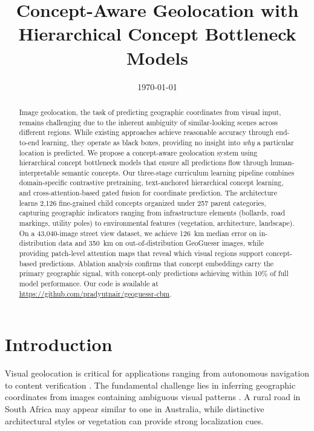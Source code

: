 \documentclass{uva-inf-article}
\title{Concept-Aware Geolocation with Hierarchical Concept Bottleneck Models}
\date{\today}
\begin{document}
\maketitle

\begingroup
\setlength{\parskip}{0pt}
\setlength{\baselineskip}{0.9\baselineskip}
\tableofcontents
\endgroup
\pagebreak

\begin{abstract}
Image geolocation, the task of predicting geographic coordinates from visual input, remains challenging due to the inherent ambiguity of similar-looking scenes across different regions. While existing approaches achieve reasonable accuracy through end-to-end learning, they operate as black boxes, providing no insight into \textit{why} a particular location is predicted. We propose a concept-aware geolocation system using hierarchical concept bottleneck models that ensure all predictions flow through human-interpretable semantic concepts. Our three-stage curriculum learning pipeline combines domain-specific contrastive pretraining, text-anchored hierarchical concept learning, and cross-attention-based gated fusion for coordinate prediction. The architecture learns 2,126 fine-grained child concepts organized under 257 parent categories, capturing geographic indicators ranging from infrastructure elements (bollards, road markings, utility poles) to environmental features (vegetation, architecture, landscape). On a 43,040-image street view dataset, we achieve 126~km median error on in-distribution data and 350~km on out-of-distribution GeoGuessr images, while providing patch-level attention maps that reveal which visual regions support concept-based predictions. Ablation analysis confirms that concept embeddings carry the primary geographic signal, with concept-only predictions achieving within 10\% of full model performance. Our code is available at \url{https://github.com/pradyutnair/geoguessr-cbm}.
\end{abstract}


\section{Introduction}
\label{sec:introduction}

Visual geolocation is critical for applications ranging from autonomous navigation to content verification \parencite{hays2008im2gps}. The fundamental challenge lies in inferring geographic coordinates from images containing ambiguous visual patterns \parencite{li2024visual}. A rural road in South Africa may appear similar to one in Australia, while distinctive architectural styles or vegetation can provide strong localization cues.
\end{document}
